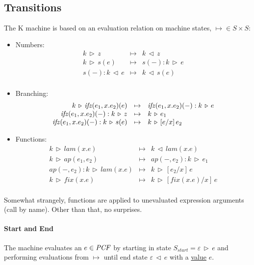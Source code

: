 \documentclass[12pt,a4paper]{article}
\begin{document}
\subsection*{Transitions}
The K machine is based on an evaluation relation on machine states, $\mapsto \in S \times S$:

\newcommand{\eval}[2]{#1 \, \triangleright \, #2}
\newcommand{\stack}[2]{#1 \, \triangleleft \, #2}

\begin{itemize}
\item Numbers:
\[
\begin{array}{rcl}
    \eval{k}{z} &\mapsto& \stack{k}{z}\\
    \eval{k}{s(e)} &\mapsto& \eval{s(-):k}{e}\\
    \stack{s(-):k}{e} &\mapsto& \stack{k}{s(e)}\\
\end{array}
\]
\item Branching:
\[
\begin{array}{rcl}
    \eval{k}{{\it ifz}(e_1, x.e_2)(e)} &\mapsto& \eval{{\it ifz}(e_1, x.e_2)(-):k}{e}\\
    \eval{{\it ifz}(e_1, x.e_2)(-): k}{z} &\mapsto& \eval{k}{e_1}\\
    \eval{{\it ifz}(e_1, x.e_2)(-): k}{s(e)} &\mapsto& \eval{k}{[e/x]\,e_2}\\
\end{array}
\]
\item Functions:
\[
\begin{array}{rcl}
    \eval{k}{lam(x.e)} &\mapsto& \stack{k}{lam(x.e)}\\
    \eval{k}{ap(e_1, e_2)} &\mapsto& \eval{ap(-, e_2): k}{e_1}\\
    \eval{ap(-, e_2):k}{lam(x.e)} &\mapsto& \eval{k}{[e_2/x]\,e}\\
    \eval{k}{fix(x.e)} &\mapsto& \eval{k}{[fix(x.e)/x]\,e}\\
\end{array}
\]
\end{itemize}

Somewhat strangely, functions are applied to unevaluated expression
arguments (call by name). Other than that, no surprises.

\paragraph*{Start and End}
The machine evaluates an $e \in {\it PCF}$ by starting in state
$S_{start} = \eval{\varepsilon}{e}$ and performing
evaluations from $\mapsto$ until end state
$ \stack{\varepsilon}{e}$ with a \underline{value} $e$.
\end{document}
